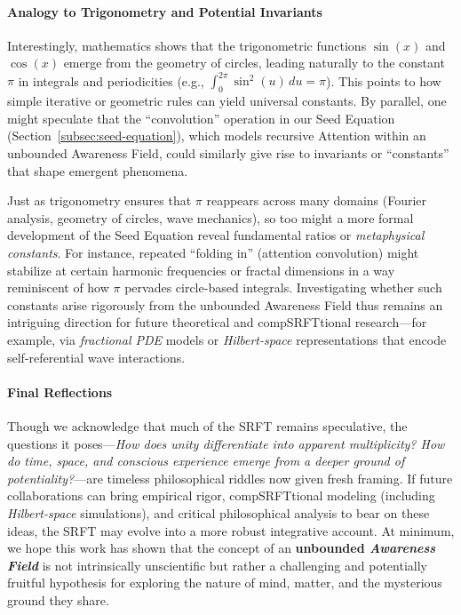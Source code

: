 \documentclass[12pt,a4paper]{article}
\begin{document}
\paragraph{Analogy to Trigonometry and Potential Invariants}
Interestingly, mathematics shows that the trigonometric functions $\sin(x)$ and 
$\cos(x)$ emerge from the geometry of circles, leading naturally to the constant 
$\pi$ in integrals and periodicities (e.g., $\int_0^{2\pi} \sin^2(u)\,du = \pi$). 
This points to how simple iterative or geometric rules can yield universal 
constants. By parallel, one might speculate that the ``convolution'' operation 
in our Seed Equation (Section~\ref{subsec:seed-equation}), which models recursive 
Attention within an unbounded Awareness Field, could similarly give rise to 
invariants or ``constants'' that shape emergent phenomena. 

\noindent
Just as trigonometry ensures that $\pi$ reappears across many domains (Fourier 
analysis, geometry of circles, wave mechanics), so too might a more formal 
development of the Seed Equation reveal fundamental ratios or 
\emph{metaphysical constants}. For instance, repeated ``folding in'' (attention 
convolution) might stabilize at certain harmonic frequencies or fractal 
dimensions in a way reminiscent of how $\pi$ pervades circle-based integrals. 
Investigating whether such constants arise rigorously from the unbounded 
Awareness Field thus remains an intriguing direction for future theoretical 
and compSRFTtional research—for example, via \emph{fractional PDE} models or 
\emph{Hilbert-space} representations that encode self-referential wave interactions.

\paragraph{Final Reflections}
Though we acknowledge that much of the SRFT remains speculative, the questions it poses—\emph{How does unity differentiate into apparent multiplicity? How do time, space, and conscious experience emerge from a deeper ground of potentiality?}—are timeless philosophical riddles now given fresh framing. If future collaborations can bring empirical rigor, compSRFTtional modeling (including \emph{Hilbert-space} simulations), and critical philosophical analysis to bear on these ideas, the SRFT may evolve into a more robust integrative account. At minimum, we hope this work has shown that the concept of an \textbf{unbounded \emph{Awareness Field}} is not intrinsically unscientific but rather a challenging and potentially fruitful hypothesis for exploring the nature of mind, matter, and the mysterious ground they share.
\end{document}
